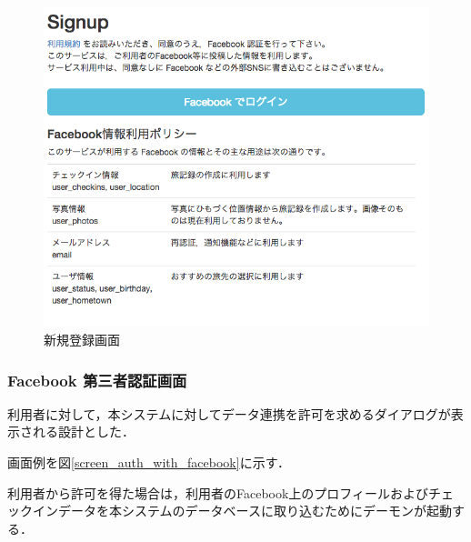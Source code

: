 \documentclass{jsarticle}
\begin{document}
\begin{figure}[!ht]
\begin{center}
\includegraphics[width=15.0cm]{./image/cheekitrip_signup.png}
\caption{新規登録画面}
\label{screen_signup}
\end{center}
\end{figure}

\subsubsection{Facebook 第三者認証画面}

利用者に対して，本システムに対してデータ連携を許可を求めるダイアログが表示される設計とした．

画面例を図\ref{screen_auth_with_facebook}に示す．

利用者から許可を得た場合は，利用者のFacebook上のプロフィールおよびチェックインデータを本システムのデータベースに取り込むためにデーモンが起動する．
\end{document}
